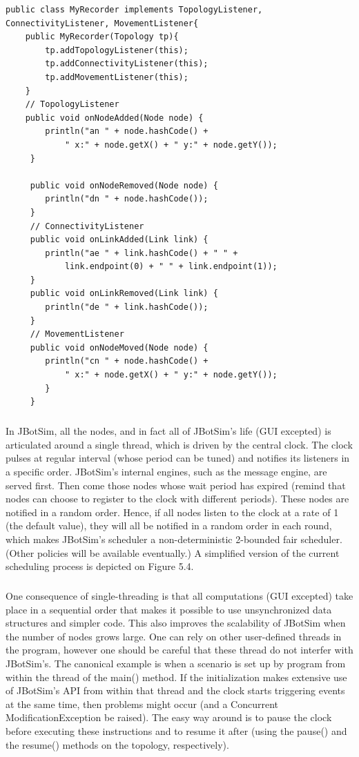\newpage
\begin{lstlisting}[caption=Example of a mobility trace recorder, captionpos=b]
public class MyRecorder implements TopologyListener, ConnectivityListener, MovementListener{
	public MyRecorder(Topology tp){
		tp.addTopologyListener(this);
		tp.addConnectivityListener(this);
		tp.addMovementListener(this);
	}
	// TopologyListener
	public void onNodeAdded(Node node) {
	 	println("an " + node.hashCode() +
	 		" x:" + node.getX() + " y:" + node.getY());
	 }
	 
	 public void onNodeRemoved(Node node) {
	 	println("dn " + node.hashCode());
	 }
	 // ConnectivityListener
	 public void onLinkAdded(Link link) {
	 	println("ae " + link.hashCode() + " " +
	 		link.endpoint(0) + " " + link.endpoint(1));
	 }
	 public void onLinkRemoved(Link link) {
	 	println("de " + link.hashCode());
	 }
	 // MovementListener
	 public void onNodeMoved(Node node) {
	 	println("cn " + node.hashCode() +
	 		" x:" + node.getX() + " y:" + node.getY());
	 	}
	 }
\end{lstlisting}
\subparagraph{}In JBotSim, all the nodes, and in fact all of JBotSim’s life (GUI excepted) is articulated around a single thread, which is driven by the central clock. The clock pulses at regular interval (whose period can be tuned) and notifies its listeners in a specific order.  JBotSim’s internal engines, such as the message engine, are served first. Then come those nodes whose wait period has expired (remind that nodes can choose to register to the clock with different periods). These nodes are notified in a random order. Hence, if all nodes listen to the clock at a rate of 1 (the default value), they will all be notified in a random order in each round, which makes  JBotSim’s scheduler a non-deterministic 2-bounded fair scheduler. (Other policies will be available eventually.) A simplified version of the current scheduling process is depicted on Figure 5.4.
\subparagraph{}One consequence of single-threading is that all computations (GUI excepted) take place in a sequential order that makes it possible to use unsynchronized data structures and simpler code. This also improves the scalability of JBotSim when the number of nodes grows large. One can rely on other user-defined threads in the program, however one should be careful that these thread do not interfer with  JBotSim’s. The canonical example is when a scenario is set up by program from within the thread of the main() method. If the initialization makes extensive use of  JBotSim’s API from within that thread and the clock starts triggering events at the same time, then problems might occur (and a Concurrent ModificationException be raised). The easy way around is to pause the clock before executing these instructions and to resume it after (using the pause() and the resume() methods on the topology, respectively).
